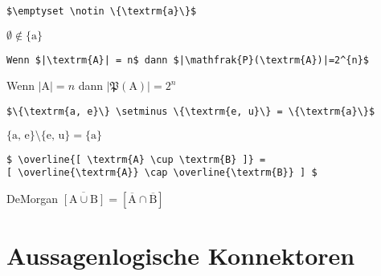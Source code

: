 \begin{frame}[fragile]

{\small
\begin{lstlisting}
$\emptyset \notin \{\textrm{a}\}$
\end{lstlisting}
}

\ea $\emptyset \notin \{\textrm{a}\}$
\z 


{\small
\begin{lstlisting}
Wenn $|\textrm{A}| = n$ dann $|\mathfrak{P}(\textrm{A})|=2^{n}$
\end{lstlisting}
}

\ea Wenn $|\textrm{A}| = n$ dann $|\mathfrak{P}(\textrm{A})|=2^{n}$
\z 


{\small
\begin{lstlisting}
$\{\textrm{a, e}\} \setminus \{\textrm{e, u}\} = \{\textrm{a}\}$
\end{lstlisting}
}

\ea $\{\textrm{a, e}\} \setminus \{\textrm{e, u}\} = \{\textrm{a}\}$
\z 

{\small
\begin{lstlisting}
$ \overline{[ \textrm{A} \cup \textrm{B} ]} = 
[ \overline{\textrm{A}} \cap \overline{\textrm{B}} ] $
\end{lstlisting}
}

\ea DeMorgan
$ \overline{[ \textrm{A} \cup \textrm{B} ]} = 
[ \overline{\textrm{A}} \cap \overline{\textrm{B}} ] $
\z 


\end{frame}


\section{Aussagenlogische Konnektoren}

